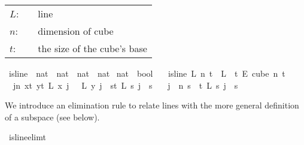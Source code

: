 \begin{isabellebody}
\begin{isamarkuptext}
\begin{tabular}{llp{8cm}}
$L$:& \isa{nat\ {\isasymRightarrow}\ nat\ {\isasymRightarrow}\ nat}& line\\
$n$:& \isa{nat}& dimension of cube\\
$t$:& \isa{nat}& the size of the cube's base\\
\end{tabular}%
\end{isamarkuptext}\isamarkuptrue%
\isamarkupfalse%
\ is{\isacharunderscore}{\kern0pt}line\ {\isacharcolon}{\kern0pt}{\isacharcolon}{\kern0pt}\ {\isachardoublequoteopen}{\isacharparenleft}{\kern0pt}nat\ {\isasymRightarrow}\ {\isacharparenleft}{\kern0pt}nat\ {\isasymRightarrow}\ nat{\isacharparenright}{\kern0pt}{\isacharparenright}{\kern0pt}\ {\isasymRightarrow}\ nat\ {\isasymRightarrow}\isanewline
nat\ {\isasymRightarrow}\ bool{\isachardoublequoteclose}\isanewline
\ \ \ {\isachardoublequoteopen}is{\isacharunderscore}{\kern0pt}line\ L\ n\ t\ {\isasymequiv}\ {\isacharparenleft}{\kern0pt}L\ {\isasymin}\ {\isacharbraceleft}{\kern0pt}{\isachardot}{\kern0pt}{\isachardot}{\kern0pt}{\isacharless}{\kern0pt}t{\isacharbraceright}{\kern0pt}\ {\isasymrightarrow}\isactrlsub E\ cube\ n\ t\ {\isasymand}\isanewline
\ \ {\isacharparenleft}{\kern0pt}{\isacharparenleft}{\kern0pt}{\isasymforall}j{\isacharless}{\kern0pt}n{\isachardot}{\kern0pt}\ {\isacharparenleft}{\kern0pt}{\isasymforall}x{\isacharless}{\kern0pt}t{\isachardot}{\kern0pt}\ {\isasymforall}y{\isacharless}{\kern0pt}t{\isachardot}{\kern0pt}\ L\ x\ j\ {\isacharequal}{\kern0pt}\ \ L\ y\ j{\isacharparenright}{\kern0pt}\ {\isasymor}\ {\isacharparenleft}{\kern0pt}{\isasymforall}s{\isacharless}{\kern0pt}t{\isachardot}{\kern0pt}\ L\ s\ j\ {\isacharequal}{\kern0pt}\ s{\isacharparenright}{\kern0pt}{\isacharparenright}{\kern0pt}\isanewline
\ \ {\isasymand}\ {\isacharparenleft}{\kern0pt}{\isasymexists}j\ {\isacharless}{\kern0pt}\ n{\isachardot}{\kern0pt}\ {\isacharparenleft}{\kern0pt}{\isasymforall}s\ {\isacharless}{\kern0pt}\ t{\isachardot}{\kern0pt}\ L\ s\ j\ {\isacharequal}{\kern0pt}\ s{\isacharparenright}{\kern0pt}{\isacharparenright}{\kern0pt}{\isacharparenright}{\kern0pt}{\isacharparenright}{\kern0pt}{\isachardoublequoteclose}%
\begin{isamarkuptext}%
We introduce an elimination rule to relate lines with the more general definition of a
subspace (see below).%
\end{isamarkuptext}\isamarkuptrue%
\isamarkupfalse%
\ is{\isacharunderscore}{\kern0pt}line{\isacharunderscore}{\kern0pt}elim{\isacharunderscore}{\kern0pt}t{\isacharunderscore}{\kern0pt}{}{\isacharcolon}{\kern0pt}\isanewline

\end{isabellebody}
